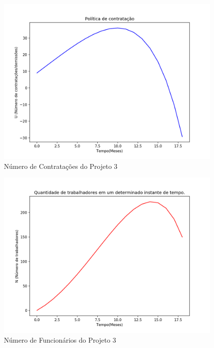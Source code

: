 \documentclass[14pt, oneside]{book}
\theoremstyle{definition}
\begin{document}
                \begin{figure}[H]
                \centering
                \includegraphics[scale=0.9]{empresa3_u.png}
                \caption{Número de Contratações do Projeto 3}
                \label{empresa3_u}
            \end{figure}
            
            \begin{figure}[H]
                \centering
                \includegraphics[scale=0.9]{empresa3_n.png}
                \caption{Número de Funcionários do Projeto 3}
                \label{empresa3_n}
            \end{figure}
            
\end{document}
